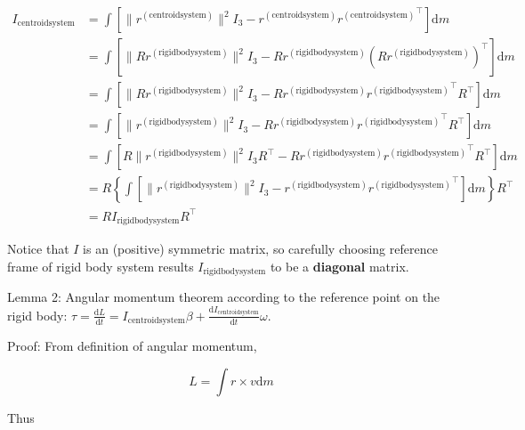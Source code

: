 \documentclass[utf8]{article}
\begin{document}
\begin{equation}\label{}
 \begin{aligned}
  I_{\mathrm{centroid system}} &= \int \left[\|r^{(\mathrm{centroid system})}\|^2 I_3 - r^{(\mathrm{centroid system})} {r^{(\mathrm{centroid system})}}^\top \right]\mathrm{d}m \\
  &= \int \left[\|R r^{(\mathrm{rigid body system})}\|^2 I_3 - R r^{(\mathrm{rigid body system})} (R r^{(\mathrm{rigid body system})})^\top \right]\mathrm{d}m \\
  &= \int \left[\|R r^{(\mathrm{rigid body system})}\|^2 I_3 - R r^{(\mathrm{rigid body system})} {r^{(\mathrm{rigid body system})}}^\top R^\top \right]\mathrm{d}m \\
  &= \int \left[\|r^{(\mathrm{rigid body system})}\|^2 I_3 - R r^{(\mathrm{rigid body system})} {r^{(\mathrm{rigid body system})}}^\top R^\top \right]\mathrm{d}m \\
  &= \int  \left[R \|r^{(\mathrm{rigid body system})}\|^2  I_3 R^\top - R r^{(\mathrm{rigid body system})} {r^{(\mathrm{rigid body system})}}^\top R^\top \right]\mathrm{d}m \\
  &= R \left\{ \int \left[\|r^{(\mathrm{rigid body system})}\|^2 I_3 - r^{(\mathrm{rigid body system})} {r^{(\mathrm{rigid body system})}}^\top \right]\mathrm{d}m \right\} R^\top \\
  &= R I_{\mathrm{rigid body system}} R^\top
 \end{aligned}
\end{equation}

Notice that $I$ is an (positive) symmetric matrix, so carefully choosing reference frame of rigid body system results $I_{\mathrm{rigid body system}}$ to be a \textbf{diagonal} matrix.

Lemma 2: Angular momentum theorem according to the reference point on the rigid body: $\tau = \frac{\mathrm{d} L}{\mathrm{d}t} = I_{\mathrm{centroid system}}\beta + \frac{\mathrm{d} I_{\mathrm{centroid system}}}{\mathrm{d}t} \omega$.

Proof: From definition of angular momentum, %

\begin{equation}\label{}
  L = \int r \times v \mathrm{d}m %
\end{equation}

Thus
\end{document}
